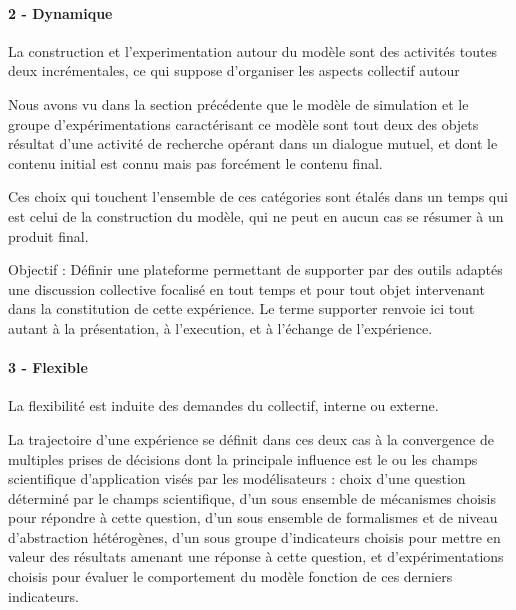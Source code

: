 
\paragraph{2 - Dynamique}

La construction et l'experimentation autour du modèle sont des activités toutes deux incrémentales, ce qui suppose d'organiser les aspects collectif autour 

Nous avons vu dans la section précédente que le modèle de simulation et le groupe d'expérimentations caractérisant ce modèle sont tout deux des objets résultat d'une activité de recherche opérant dans un dialogue mutuel, et dont le contenu initial est connu mais pas forcément le contenu final.


Ces choix qui touchent l'ensemble de ces catégories sont étalés dans un temps qui est celui de la construction du modèle, qui ne peut en aucun cas se résumer à un produit final. 

Objectif : Définir une plateforme permettant de supporter par des outils adaptés une discussion collective focalisé en tout temps et pour tout objet intervenant dans la constitution de cette expérience. Le terme supporter renvoie ici tout autant à la présentation, à l'execution, et à l'échange de l'expérience.

\paragraph{3 - Flexible}

La flexibilité est induite des demandes du collectif, interne ou externe.

La trajectoire d'une expérience se définit dans ces deux cas à la convergence de multiples prises de décisions dont la principale influence est le ou les champs scientifique d'application visés par les modélisateurs : choix d'une question déterminé par le champs scientifique, d'un sous ensemble de mécanismes choisis pour répondre à cette question, d'un sous ensemble de formalismes et de niveau d'abstraction hétérogènes, d'un sous groupe d'indicateurs choisis pour mettre en valeur des résultats amenant une réponse à cette question, et d'expérimentations choisis pour évaluer le comportement du modèle fonction de ces derniers indicateurs. 

